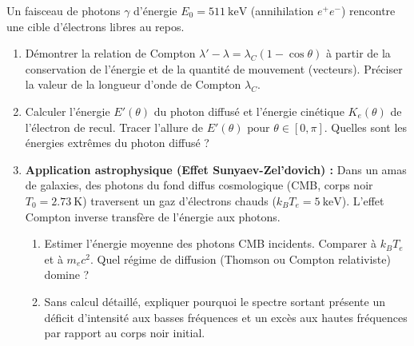 \documentclass[11pt]{article}
\begin{document}
\begin{exercice}
Un faisceau de photons $\gamma$ d'énergie $E_0 = \SI{511}{\kilo\electronvolt}$ (annihilation $e^+e^-$) rencontre une cible d'électrons libres au repos.
\begin{enumerate}
    \item Démontrer la relation de Compton $\lambda' - \lambda = \lambda_C (1 - \cos\theta)$ à partir de la conservation de l'énergie et de la quantité de mouvement (vecteurs). Préciser la valeur de la longueur d'onde de Compton $\lambda_C$.
    \item Calculer l'énergie $E'(\theta)$ du photon diffusé et l'énergie cinétique $K_e(\theta)$ de l'électron de recul. Tracer l'allure de $E'(\theta)$ pour $\theta \in [0, \pi]$. Quelles sont les énergies extrêmes du photon diffusé ?
    \item \textbf{Application astrophysique (Effet Sunyaev-Zel'dovich) :} Dans un amas de galaxies, des photons du fond diffus cosmologique (CMB, corps noir $T_0 = \SI{2,73}{\kelvin}$) traversent un gaz d'électrons chauds ($k_B T_e = \SI{5}{\kilo\electronvolt}$). L'effet Compton inverse transfère de l'énergie aux photons.
    \begin{enumerate}
        \item Estimer l'énergie moyenne des photons CMB incidents. Comparer à $k_B T_e$ et à $m_ec^2$. Quel régime de diffusion (Thomson ou Compton relativiste) domine ?
        \item Sans calcul détaillé, expliquer pourquoi le spectre sortant présente un déficit d'intensité aux basses fréquences et un excès aux hautes fréquences par rapport au corps noir initial.
    \end{enumerate}
\end{enumerate}
\end{exercice}
\end{document}
